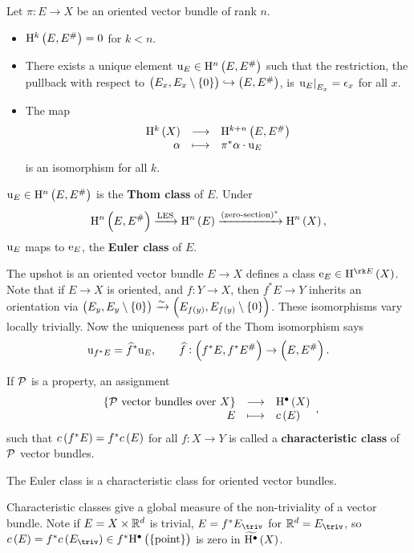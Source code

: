\begin{theorem}
Let $ \pi : E \to X $ be an oriented vector bundle of rank $ n $.
\begin{itemize}
\item $ \H^k\br{E, E^\#} = 0 $ for $ k < n $.
\item There exists a unique element $ \u_E \in \H^n\br{E, E^\#} $ such that the restriction, the pullback with respect to $ \br{E_x, E_x \setminus \cbr{0}} \hookrightarrow \br{E, E^\#} $, is $ \left. \mathrm{u}_E \right|_{E_x} = \epsilon_x $ for all $ x $.
\item The map
$$ \function{\H^k\br{X}}{\H^{k + n}\br{E, E^\#}}{\alpha}{\pi^*\alpha \cdot \u_E} $$
is an isomorphism for all $ k $.
\end{itemize}
\end{theorem}

\begin{definition*}
$ \u_E \in \H^n\br{E, E^\#} $ is the \textbf{Thom class} of $ E $. Under
$$ \H^n\br{E, E^\#} \xrightarrow{\text{LES}} \H^n\br{E} \xrightarrow{\br{\text{zero-section}}^*} \H^n\br{X}, $$
$ \mathrm{u}_E $ maps to $ \mathrm{e}_E $, the \textbf{Euler class} of $ E $.
\end{definition*}

The upshot is an oriented vector bundle $ E \to X $ defines a class $ \e_E \in \H^{\rk E}\br{X} $. Note that if $ E \to X $ is oriented, and $ f : Y \to X $, then $ f^*E \to Y $ inherits an orientation via $ \br{E_y, E_y \setminus \cbr{0}} \xrightarrow{\sim} \br{E_{f\br{y}}, E_{f\br{y}} \setminus \cbr{0}} $. These isomorphisms vary locally trivially. Now the uniqueness part of the Thom isomorphism says
$$ \u_{f^*E} = \widehat{f}^*\u_E, \qquad \widehat{f} : \br{f^*E, f^*E^\#} \to \br{E, E^\#}. $$

\pagebreak

\begin{definition*}
If $ \mathcal{P} $ is a property, an assignment
$$ \function{\cbr{\PPP \ \text{vector bundles over} \ X}}{\H^\bullet\br{X}}{E}{c\br{E}}, $$
such that $ c\br{f^*E} = f^*c\br{E} $ for all $ f : X \to Y $ is called a \textbf{characteristic class} of $ \mathcal{P} $ vector bundles.
\end{definition*}

\begin{example*}
The Euler class is a characteristic class for oriented vector bundles.
\end{example*}

Characteristic classes give a global measure of the non-triviality of a vector bundle. Note if $ E = X \times \mathbb{R}^d $ is trivial, $ E = f^*E_{\triv} $ for $ \RR^d = E_{\triv} $, so $ c\br{E} = f^*c\br{E_{\triv}} \in f^*\H^\bullet\br{\pt} $ is zero in $ \widetilde{\H^\bullet}\br{X} $.

